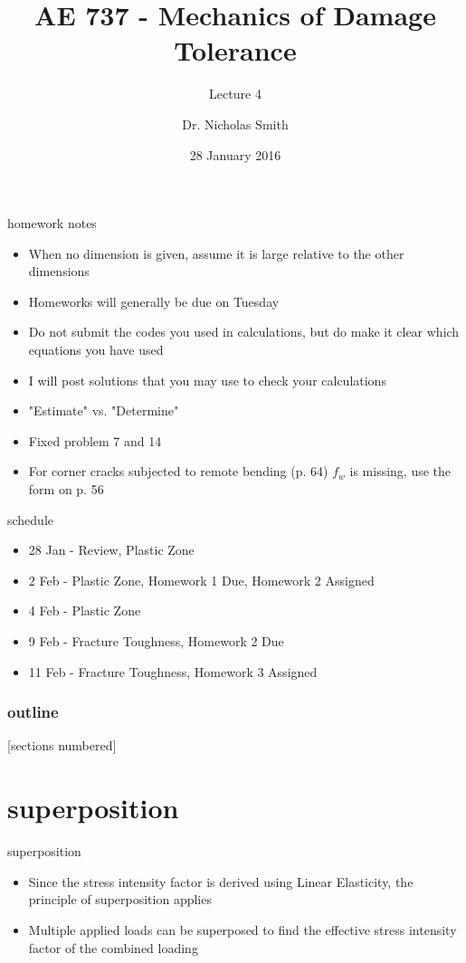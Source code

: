 \documentclass[10pt,handout]{beamer}
\title{AE 737 - Mechanics of Damage Tolerance}
\subtitle{Lecture 4}
\date{28 January 2016}
\author{Dr. Nicholas Smith}
\institute{Wichita State University, Department of Aerospace Engineering}
\begin{document}
\maketitle

\begin{frame}{homework notes}
	\begin{itemize}
		\item When no dimension is given, assume it is large relative to the other dimensions
		\item Homeworks will generally be due on Tuesday
		\item Do not submit the codes you used in calculations, but do make it clear which equations you have used
		\item I will post solutions that you may use to check your calculations
		\item "Estimate" vs. "Determine"
		\item Fixed problem 7 and 14
		\item For corner cracks subjected to remote bending (p. 64) $f_w$ is missing, use the form on p. 56
	\end{itemize}
\end{frame}

\begin{frame}{schedule}
	\begin{itemize}
		\item 28 Jan - Review, Plastic Zone
		\item 2 Feb - Plastic Zone, Homework 1 Due, Homework 2 Assigned
		\item 4 Feb - Plastic Zone
		\item 9 Feb - Fracture Toughness, Homework 2 Due
		\item 11 Feb - Fracture Toughness, Homework 3 Assigned
	\end{itemize}
\end{frame}

\begin{frame}
  \frametitle{outline}
  [sections numbered]
  \tableofcontents[hideallsubsections]
\end{frame}

\section{superposition}

\begin{frame}{superposition}
	\begin{itemize}
		\item Since the stress intensity factor is derived using Linear Elasticity, the principle of superposition applies
		\item Multiple applied loads can be superposed to find the effective stress intensity factor of the combined loading
	\end{itemize}
\end{frame}
\end{document}
